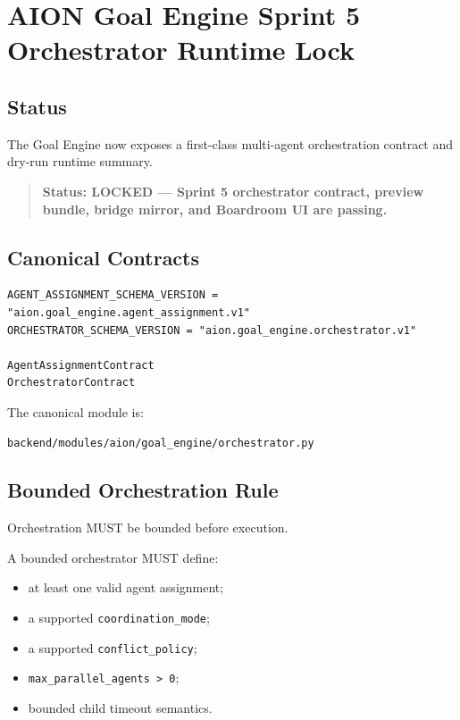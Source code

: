 \section{AION Goal Engine Sprint 5 Orchestrator Runtime Lock}
\label{sec:aion-goal-engine-sprint5-orchestrator-runtime-lock}

\subsection{Status}

The Goal Engine now exposes a first-class multi-agent orchestration contract and dry-run runtime summary.

\begin{quote}
\textbf{Status: LOCKED --- Sprint 5 orchestrator contract, preview bundle, bridge mirror, and Boardroom UI are passing.}
\end{quote}

\subsection{Canonical Contracts}

\begin{verbatim}
AGENT_ASSIGNMENT_SCHEMA_VERSION = "aion.goal_engine.agent_assignment.v1"
ORCHESTRATOR_SCHEMA_VERSION = "aion.goal_engine.orchestrator.v1"

AgentAssignmentContract
OrchestratorContract
\end{verbatim}

The canonical module is:

\begin{verbatim}
backend/modules/aion/goal_engine/orchestrator.py
\end{verbatim}

\subsection{Bounded Orchestration Rule}

Orchestration MUST be bounded before execution.

A bounded orchestrator MUST define:

\begin{itemize}
  \item at least one valid agent assignment;
  \item a supported \texttt{coordination_mode};
  \item a supported \texttt{conflict_policy};
  \item \texttt{max_parallel_agents > 0};
  \item bounded child timeout semantics.
\end{itemize}

